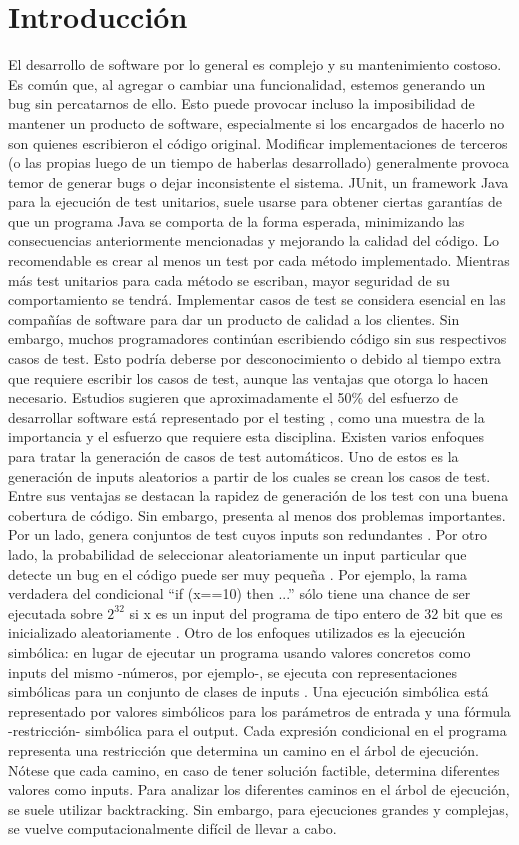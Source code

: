 \documentclass{llncs}
\begin{document}
\section{Introducción}
El desarrollo de software por lo general es complejo y su mantenimiento costoso. Es común que, al agregar o cambiar una funcionalidad, estemos generando un bug sin percatarnos de ello. Esto puede provocar incluso la imposibilidad de mantener un producto de software, especialmente si los encargados de hacerlo no son quienes escribieron el código original. Modificar implementaciones de terceros (o las propias luego de un tiempo de haberlas desarrollado) generalmente provoca temor de generar bugs o dejar inconsistente el sistema. 
JUnit, un framework Java para la ejecución de test unitarios, suele usarse para obtener ciertas garantías de que un programa Java se comporta de la forma esperada, minimizando las consecuencias anteriormente mencionadas y mejorando la calidad del código. Lo recomendable es crear al menos un test por cada método implementado. Mientras más test unitarios para cada método se escriban, mayor seguridad de su comportamiento se tendrá.
Implementar casos de test se considera esencial en las compañías de software para dar un producto de calidad a los clientes. Sin embargo, muchos programadores continúan escribiendo código sin sus respectivos casos de test. Esto podría deberse por desconocimiento o debido al tiempo extra que requiere escribir los casos de test, aunque las ventajas que otorga lo hacen necesario. Estudios sugieren que aproximadamente el 50\% del esfuerzo de desarrollar software está representado por el testing \cite{econImpact}, como una muestra de la importancia y el esfuerzo que requiere esta disciplina.
Existen varios enfoques para tratar la generación de casos de test automáticos. Uno de estos es la generación de inputs aleatorios a partir de los cuales se crean los casos de test. Entre sus ventajas se destacan la rapidez de generación de los test con una buena cobertura de código. Sin embargo, presenta al menos dos problemas importantes. Por un lado, genera conjuntos de test cuyos inputs son redundantes \cite{cute}. Por otro lado, la probabilidad de seleccionar aleatoriamente un input particular que detecte un bug en el código puede ser muy pequeña \cite{cute}. Por ejemplo, la rama verdadera del condicional
“if (x==10) then ...” sólo tiene una chance de ser ejecutada sobre \(2^{32}\) si x es un input del programa de tipo entero de 32 bit que es inicializado aleatoriamente \cite{dart}.
Otro de los enfoques utilizados es la ejecución simbólica: en lugar de ejecutar un programa usando valores concretos como inputs del mismo -números, por ejemplo-, se ejecuta con representaciones simbólicas para un conjunto de clases de inputs \cite{symb}. Una ejecución simbólica está representado por valores simbólicos para los parámetros de entrada y una fórmula -restricción- simbólica para el output. Cada expresión condicional en el programa representa una restricción que determina un camino en el árbol de ejecución. Nótese que cada camino, en caso de tener solución factible, determina diferentes valores como inputs. Para analizar los diferentes caminos en el árbol de ejecución, se suele utilizar backtracking. Sin embargo, para ejecuciones grandes y complejas, se vuelve computacionalmente difícil de llevar a cabo.
\end{document}
